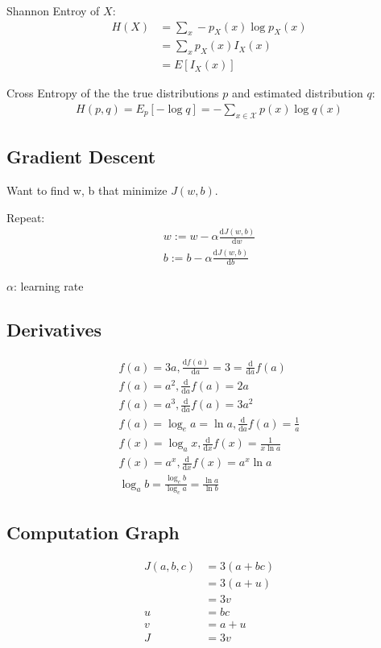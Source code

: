 Shannon Entroy of $X$:
\begin{align}
	H(X) &= \sum_{x} -p_X(x)\log{p_X(x)} \\
	&= \sum_{x} p_X(x)I_X(x) \\
	&= E[I_X(x)]
\end{align}

Cross Entropy of the the true distributions $p$ and estimated distribution $q$:
\begin{align}
	H(p, q) = E_p[-\log{q}] = -\sum_{x \in \mathcal X} p(x) \log{q(x)}
\end{align}


\subsection{Gradient Descent}
Want to find w, b that minimize $J(w, b)$.

Repeat:
\begin{align}
	w := w - \alpha \frac{\mathrm{d} J(w,b)}{\mathrm{d} w} \\
	b := b - \alpha \frac{\mathrm{d} J(w,b)}{\mathrm{d} b}
\end{align}

$\alpha$: learning rate


\subsection{Derivatives}
\begin{align}
	f(a) = 3a, \frac{\mathrm{d} f(a)}{\mathrm{d} a} = 3 = \frac{\mathrm{d}}{\mathrm{d} a} f(a) \\
	f(a) = a^2, \frac{\mathrm{d}}{\mathrm{d} a} f(a) = 2a \\
	f(a) = a^3, \frac{\mathrm{d}}{\mathrm{d} a} f(a) = 3a^2 \\
	f(a) = \log_e{a} = \ln{a}, \frac{\mathrm{d}}{\mathrm{d} a} f(a) = \frac{1}{a} \\
	f(x) = \log_a{x}, \frac{\mathrm{d}}{\mathrm{d} x} f(x) = \frac{1}{x\ln{a}} \\
	f(x) = a^x, \frac{\mathrm{d}}{\mathrm{d} x} f(x) = a^x \ln{a} \\
	\log_a{b} = \frac{\log_c{b}}{\log_c{a}} = \frac{\ln{a}}{\ln{b}}
\end{align}


\subsection{Computation Graph}
\begin{align}
	J(a, b, c) &= 3(a + bc) \\
	&= 3(a + u) \\
	&= 3v \\
	u &= bc \\
	v &= a + u \\
	J &= 3v 
\end{align}


